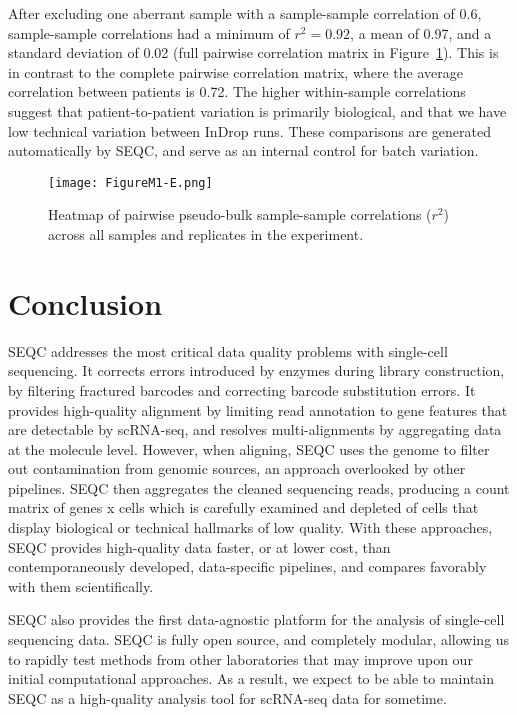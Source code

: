 After excluding one aberrant sample with a sample-sample correlation of 0.6, sample-sample correlations had a minimum of $r^{2}=0.92$, a mean of 0.97, and a standard deviation of 0.02 (full pairwise correlation matrix in Figure~\ref{fig:m1e}). %
This is in contrast to the complete pairwise correlation matrix, where the average correlation between patients is 0.72. 
The higher within-sample correlations suggest that patient-to-patient variation is primarily biological, and that we have low technical variation between InDrop runs. 
These comparisons are generated automatically by SEQC, and serve as an internal control for batch variation.

\begin{figure}
\centering
\texttt{[image: FigureM1-E.png]}
\caption{Heatmap of pairwise pseudo-bulk sample-sample correlations ($r^2$) across all samples
and replicates in the experiment.
}
\label{fig:m1e}
\end{figure}

\section{Conclusion}

SEQC addresses the most critical data quality problems with single-cell sequencing. 
It corrects errors introduced by enzymes during library construction, by filtering fractured barcodes and correcting barcode substitution errors. 
It provides high-quality alignment by limiting read annotation to gene features that are detectable by scRNA-seq, and resolves multi-alignments by aggregating data at the molecule level.  
However, when aligning, SEQC uses the genome to filter out contamination from genomic sources, an approach overlooked by other pipelines. 
SEQC then aggregates the cleaned sequencing reads, producing a count matrix of genes x cells which is carefully examined and depleted of cells that display biological or technical hallmarks of low quality. 
With these approaches, SEQC provides high-quality data faster, or at lower cost, than contemporaneously developed, data-specific pipelines, and compares favorably with them scientifically.  %

SEQC also provides the first data-agnostic platform for the analysis of single-cell sequencing data.
SEQC is fully open source, and completely modular, allowing us to rapidly test methods from other laboratories that may improve upon our initial computational approaches. 
As a result, we expect to be able to maintain SEQC as a high-quality analysis tool for scRNA-seq data for sometime. 

